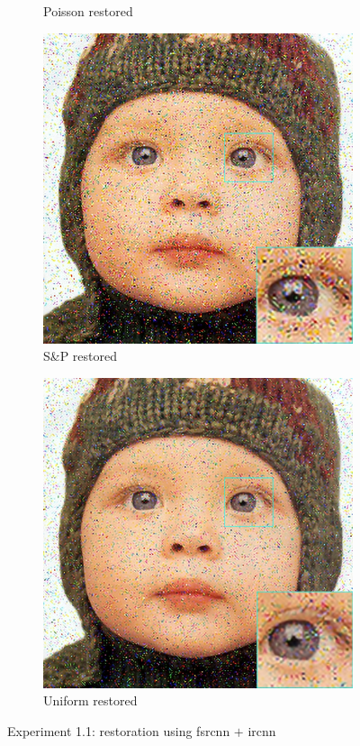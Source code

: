 \begin{figure}
\begin{subfigure}{0.24\textwidth}
		\caption{Poisson restored}
	\end{subfigure}
	\begin{subfigure}{0.24\textwidth}
		\includegraphics[width=\textwidth]{images/exp1.1/salt.png}
		\caption{S\&P restored}
	\end{subfigure}
	\begin{subfigure}{0.24\textwidth}
		\includegraphics[width=\textwidth]{images/exp1.1/uniform.png}
		\caption{Uniform restored}
	\end{subfigure}
	\caption{Experiment 1.1: restoration using \gls{fsrcnn} $+$ \gls{ircnn}}
	\label{fig:exp1.1}
\end{figure}

